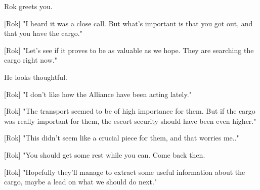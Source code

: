 \documentclass[a4paper,12pt]{article}
\begin{document}
Rok greets you. 

[Rok] "I heard it was a close call. But what's important is that you got out, and
that you have the cargo." 

[Rok] "Let's see if it proves to be as valuable as we hope. They are searching the cargo right now."

He looks thoughtful. 

[Rok] "I don't like how the Alliance have been acting lately." 

[Rok] "The transport seemed to be of high importance for them. But if the cargo was really important for them, the escort security
should have been even higher."

[Rok] "This didn't seem like a crucial piece for them, and that worries me.."

[Rok] "You should get some rest while you can. Come back then. 

[Rok] "Hopefully they'll manage to extract some useful information about the cargo, 
maybe a lead on what we should do next."
\end{document}
